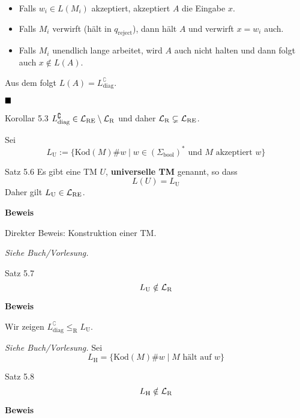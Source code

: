             
                \begin{itemize}[label=-]
                    \item Falls $w_i \in L(M_i)$ akzeptiert, akzeptiert $A$ die Eingabe $x$.
                    \item Falls $M_i$ verwirft (hält in $q_{\text{reject}}$), dann hält $A$ und verwirft $x = w_i$ auch.
                    \item Falls $M_i$ unendlich lange arbeitet, wird $A$ auch nicht halten und dann folgt auch $x \notin L(A)$.  
                \end{itemize}
                Aus dem folgt $L(A) = L_{\text{diag}}^\complement$.
            
                $\hfill\blacksquare$
                \begin{subbox}{Korollar 5.3}
                    $L_{\text{diag}}^\complement \in \mathcal{L}_\text{RE} \setminus \mathcal{L}_\text{R}$ und daher $\mathcal{L}_\text{R} \subsetneq \mathcal{L}_\text{RE}$.
                \end{subbox}
            
            
                Sei 
                $$L_{\text{U}} := \{\text{Kod}(M)\#w \mid w \in (\Sigma_{\text{bool}})^* \text{ und } M \text{ akzeptiert }w\}$$
                \begin{mainbox}{Satz 5.6}
                    Es gibt eine TM $U$, \textbf{universelle TM} genannt, so dass 
                    $$L(U) = L_{\text{U}}$$
                    Daher gilt $L_{\text{U}} \in \mathcal{L}_\text{RE}$.
                \end{mainbox} 
                \textbf{Beweis}
            
                Direkter Beweis: Konstruktion einer TM.
            
                \textit{Siehe Buch/Vorlesung.}
            
                \begin{mainbox}{Satz 5.7}
                    $$L_{\text{U}} \notin \mathcal{L}_\text{R}$$
                \end{mainbox}
                \textbf{Beweis}
            
                Wir zeigen $L_{\text{diag}}^\complement \leq_{\text{R}} L_{\text{U}}$.
            
                \textit{Siehe Buch/Vorlesung.}
                Sei $$L_{\text{H}} = \{\text{Kod}(M)\#w \mid M \text{ hält auf }w\}$$
                \begin{mainbox}{Satz 5.8}
                    $$L_{\text{H}} \notin \mathcal{L}_\text{R}$$
                \end{mainbox}
                \textbf{Beweis}
            
